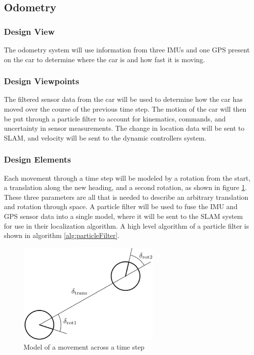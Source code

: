 \documentclass[10pt, onecolumn, draftclsnofoot, letterpaper,compsoc]{IEEEtran}
\begin{document}
\subsection{Odometry}
\subsubsection{Design View} %
The odometry system will use information from three IMUs and one GPS present on the car to determine where the car is and how fast it is moving.

\subsubsection{Design Viewpoints} %
The filtered sensor data from the car will be used to determine how the car has moved over the course of the previous time step. The motion of the car will then be put through a particle filter to account for kinematics, commands, and uncertainty in sensor measurements. The change in location data will be sent to SLAM, and velocity will be sent to the dynamic controllers system. 

\subsubsection{Design Elements} %
Each movement through a time step will be modeled by a rotation from the start, a translation along the new heading, and a second rotation, as shown in figure \ref{fig:motionModel}. These three parameters are all that is needed to describe an arbitrary translation and rotation through space. A particle filter will be used to fuse the IMU and GPS sensor data into a single model, where it will be sent to the SLAM system for use in their localization algorithm. A high level algorithm of a particle filter is shown in algorithm \ref{alg:particleFilter}.

\begin{figure}[htbp]
\centering
\label{fig:motionModel}
\caption{Model of a movement across a time step}
\includegraphics[width=7cm]{images/motionModel}
\end{figure}
\end{document}

